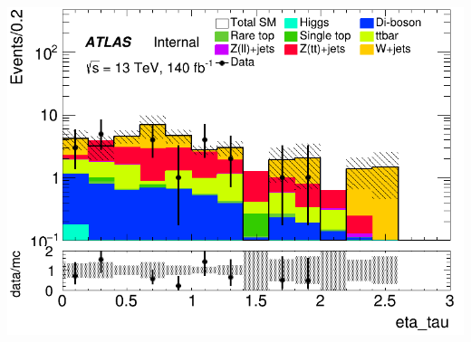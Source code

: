 \documentclass[usenames,dvipsnames]{beamer}
\begin{document}
\begin{frame}
\begin{minipage}{0.32\textwidth}
        \includegraphics[width=\textwidth]{graphics/HHH_met/HHH_met_eta_tau.png}
    \end{minipage}
\end{frame}
\end{document}

